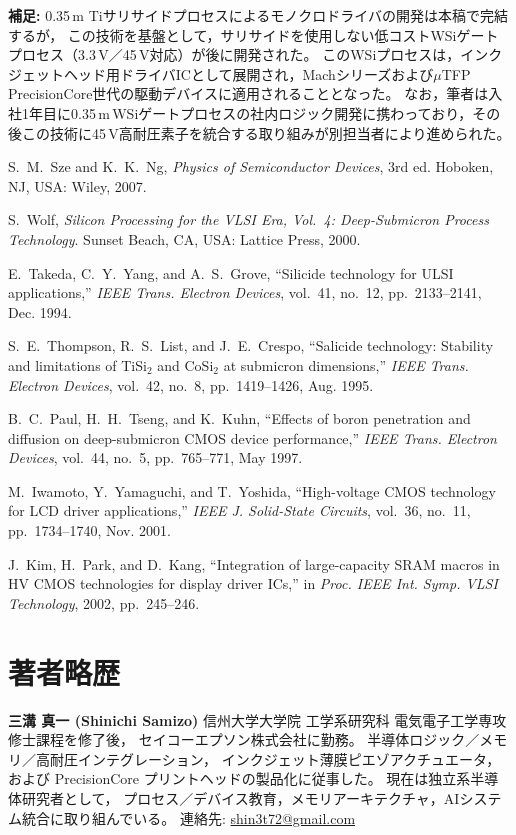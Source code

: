 \documentclass[conference]{IEEEtran}
\begin{document}
\vspace{1em}
\noindent\textbf{補足:}  
0.35\,\textmu m Tiサリサイドプロセスによるモノクロドライバの開発は本稿で完結するが，  
この技術を基盤として，サリサイドを使用しない低コストWSiゲートプロセス（3.3\,V／45\,V対応）が後に開発された。  
このWSiプロセスは，インクジェットヘッド用ドライバICとして展開され，Machシリーズおよび$\mu$TFP\,PrecisionCore世代の駆動デバイスに適用されることとなった。  
なお，筆者は入社1年目に0.35\,\textmu m\,WSiゲートプロセスの社内ロジック開発に携わっており，その後この技術に45\,V高耐圧素子を統合する取り組みが別担当者により進められた。  

\begin{thebibliography}{99}

S.~M.~Sze and K.~K.~Ng, \emph{Physics of Semiconductor Devices}, 3rd ed.
Hoboken, NJ, USA: Wiley, 2007.

S.~Wolf, \emph{Silicon Processing for the VLSI Era, Vol.~4: Deep-Submicron Process Technology}.
Sunset Beach, CA, USA: Lattice Press, 2000.

E.~Takeda, C.~Y.~Yang, and A.~S.~Grove, ``Silicide technology for ULSI applications,''
\emph{IEEE Trans. Electron Devices}, vol.~41, no.~12, pp.~2133--2141, Dec. 1994.

S.~E.~Thompson, R.~S.~List, and J.~E.~Crespo, 
``Salicide technology: Stability and limitations of TiSi$_2$ and CoSi$_2$ at submicron dimensions,''
\emph{IEEE Trans. Electron Devices}, vol.~42, no.~8, pp.~1419--1426, Aug. 1995.

B.~C.~Paul, H.~H.~Tseng, and K.~Kuhn,
``Effects of boron penetration and diffusion on deep-submicron CMOS device performance,''
\emph{IEEE Trans. Electron Devices}, vol.~44, no.~5, pp.~765--771, May 1997.

M.~Iwamoto, Y.~Yamaguchi, and T.~Yoshida,
``High-voltage CMOS technology for LCD driver applications,''
\emph{IEEE J. Solid-State Circuits}, vol.~36, no.~11, pp.~1734--1740, Nov. 2001.

J.~Kim, H.~Park, and D.~Kang,
``Integration of large-capacity SRAM macros in HV CMOS technologies for display driver ICs,''
in \emph{Proc. IEEE Int. Symp. VLSI Technology}, 2002, pp.~245--246.

\end{thebibliography}

\section*{著者略歴}
\noindent\textbf{三溝 真一 (Shinichi Samizo)}  
信州大学大学院 工学系研究科 電気電子工学専攻修士課程を修了後，  
セイコーエプソン株式会社に勤務。  
半導体ロジック／メモリ／高耐圧インテグレーション，  
インクジェット薄膜ピエゾアクチュエータ，  
および PrecisionCore プリントヘッドの製品化に従事した。  
現在は独立系半導体研究者として，  
プロセス／デバイス教育，メモリアーキテクチャ，AIシステム統合に取り組んでいる。  
連絡先: \href{mailto:shin3t72@gmail.com}{shin3t72@gmail.com}
\end{document}
